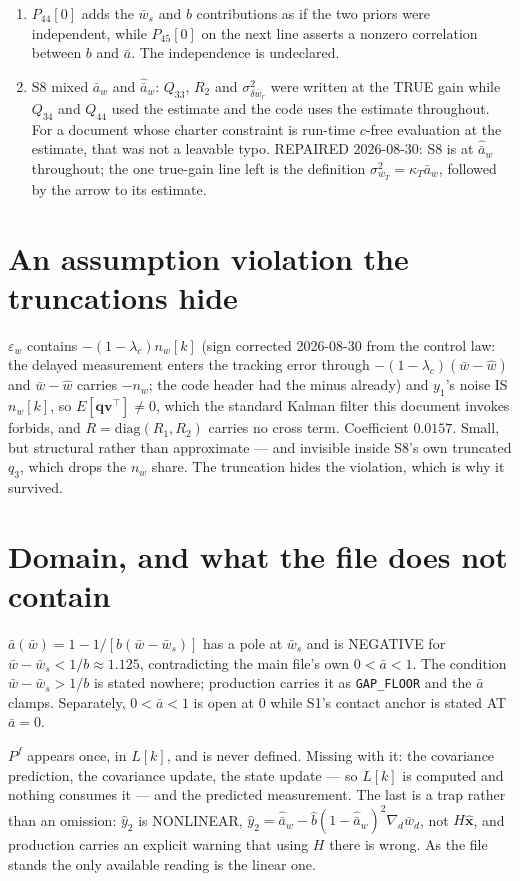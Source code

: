 \documentclass[11pt,a4paper,fontset=none]{ctexart}
\newcommand{\ba}{\bar{a}}
\newcommand{\bw}{\bar{w}}
\begin{document}
\begin{enumerate}
\item $P_{44}[0]$ adds the $\bw_s$ and $b$ contributions as if the two priors
were independent, while $P_{45}[0]$ on the next line asserts a nonzero
correlation between $b$ and $\ba$. The independence is undeclared.

\item S8 mixed $\ba_w$ and $\hat{\ba}_w$: $Q_{33}$, $R_2$ and
$\sigma^{2}_{\delta\bw_r}$ were written at the TRUE gain while $Q_{34}$ and
$Q_{44}$ used the estimate and the code uses the estimate throughout. For a
document whose charter constraint is run-time $c$-free evaluation at the
estimate, that was not a leavable typo. REPAIRED 2026-08-30: S8 is at
$\hat{\ba}_w$ throughout; the one true-gain line left is the definition
$\sigma^{2}_{w_T} = \kappa_T\ba_w$, followed by the arrow to its estimate.
\end{enumerate}

\section*{An assumption violation the truncations hide}

$\varepsilon_w$ contains $-(1-\lambda_c)n_w[k]$ (sign corrected 2026-08-30 from
the control law: the delayed measurement enters the tracking error through
$-(1-\lambda_c)(\bw - \hat{w})$ and $\bw - \hat{w}$ carries $-n_w$; the code
header had the minus already) and $y_1$'s noise IS $n_w[k]$, so
$E[\mathbf{q}\mathbf{v}^{\top}] \neq 0$, which the standard Kalman filter this
document invokes forbids, and $R = \mathrm{diag}(R_1,R_2)$ carries no cross
term. Coefficient $0.0157$. Small, but structural rather than approximate --- and
invisible inside S8's own truncated $q_3$, which drops the $n_w$ share. The
truncation hides the violation, which is why it survived.

\section*{Domain, and what the file does not contain}

$\ba(\bw) = 1 - 1/[b(\bw-\bw_s)]$ has a pole at $\bw_s$ and is NEGATIVE for
$\bw - \bw_s < 1/b \approx 1.125$, contradicting the main file's own
$0 < \ba < 1$. The condition $\bw - \bw_s > 1/b$ is stated nowhere; production
carries it as \texttt{GAP\_FLOOR} and the $\ba$ clamps. Separately, $0 < \ba < 1$
is open at 0 while S1's contact anchor is stated AT $\ba = 0$.

$P^{f}$ appears once, in $L[k]$, and is never defined. Missing with it: the
covariance prediction, the covariance update, the state update --- so $L[k]$ is
computed and nothing consumes it --- and the predicted measurement. The last is a
trap rather than an omission: $\hat{y}_2$ is NONLINEAR,
$\hat{y}_2 = \hat{\ba}_w - \hat{b}(1-\hat{\ba}_w)^{2}\nabla_d\bw_d$, not
$H\hat{\mathbf{x}}$, and production carries an explicit warning that using $H$
there is wrong. As the file stands the only available reading is the linear one.
\end{document}
